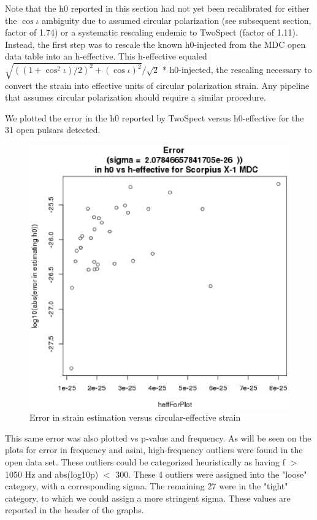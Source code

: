 Note that the h0 reported in this section had not yet been recalibrated for either the $\cos \iota$ ambiguity due to assumed circular polarization (see subsequent section, factor of 1.74) or a systematic rescaling endemic to TwoSpect (factor of 1.11). Instead, the first step was to rescale the known h0-injected from the MDC open data table into an h-effective. This h-effective equaled $\sqrt{ ((1+\cos^2 \iota) / 2)^2 + (\cos \iota)^2 }/\sqrt{2}$ * h0-injected, the rescaling necessary to convert the strain into effective units of circular polarization strain. Any pipeline that assumes circular polarization should require a similar procedure.

We plotted the error in the h0 reported by TwoSpect versus h0-effective for the 31 open pulsars detected.


\begin{figure}
\begin{center}
\includegraphics[width=0.3\paperwidth,height=0.2\paperheight]{detectedHerrVsHeffective.eps}
\caption{ Error in strain estimation versus circular-effective strain
} 
\end{center}
\end{figure}


This same error was also plotted vs p-value and frequency. As will be seen on the plots for error in frequency and asini, high-frequency outliers were found in the open data set. These outliers could be categorized heuristically as having f $>$ 1050 Hz and abs(log10p) $<$ 300. These 4 outliers were assigned into the "loose" category, with a corresponding sigma. The remaining 27 were in the "tight" category, to which we could assign a more stringent sigma. These values are reported in the header of the graphs.

